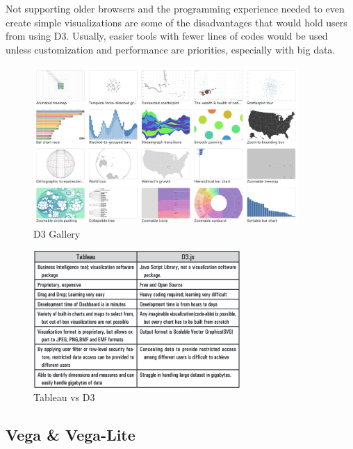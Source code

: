 Not supporting older browsers and the programming experience needed to even create simple visualizations are some of the disadvantages that would hold users from using D3. Usually, easier tools with fewer lines of codes would be used unless customization and performance are priorities, especially with big data. 

\begin{figure}[H]
\centering
\captionsetup{justification=centering}
\includegraphics[width=0.9\textwidth]{./pics/d3.png}
\caption{D3 Gallery \cite{d3g}}
\label{fig:d3}
\end{figure}


\begin{figure}[H]
\centering
\captionsetup{justification=centering}
\includegraphics[width=0.7\textwidth]{./pics/tVd3.png}
\caption{Tableau vs D3 \cite{nair2016interactive}}
\label{fig:tableauvsd3}
\end{figure}

\subsection{Vega \& Vega-Lite}

